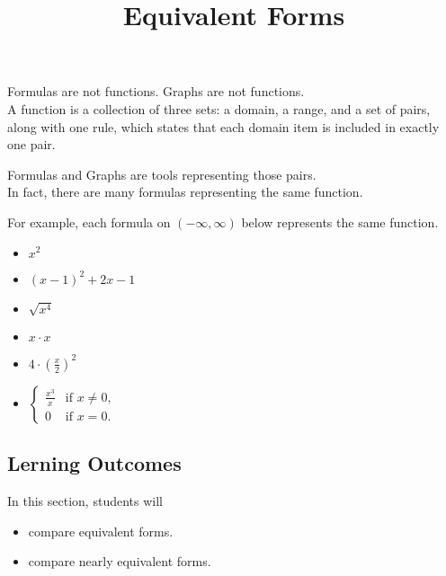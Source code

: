 \documentclass{ximera}
\title{Equivalent Forms}
\begin{document}
\begin{abstract}
\end{abstract}
\maketitle




Formulas are not functions.  Graphs are not functions. \\


A function is a collection of three sets: a domain, a range, and a set of pairs, along with one rule, which states that each domain item is included in exactly one pair.

Formulas and Graphs are tools representing those pairs.  \\


In fact, there are many formulas representing the same function.

For example, each formula on $(-\infty, \infty)$ below represents the same function.


\begin{itemize}
\item $x^2$
\item $(x - 1)^2 + 2 x - 1$
\item $\sqrt{x^4}$
\item $ x \cdot x$
\item $ 4 \cdot \left( \frac{x}{2} \right)^2$
\item $\begin{cases}
  \frac{x^3}{x} &\text{if $x \ne 0$,}\\
  0 &\text{if $x = 0$}.
\end{cases}$
\end{itemize}









\subsection{Lerning Outcomes}


\begin{sectionOutcomes}
In this section, students will 

\begin{itemize}
\item compare equivalent forms.
\item compare nearly equivalent forms.
\end{itemize}
\end{sectionOutcomes}
\end{document}
